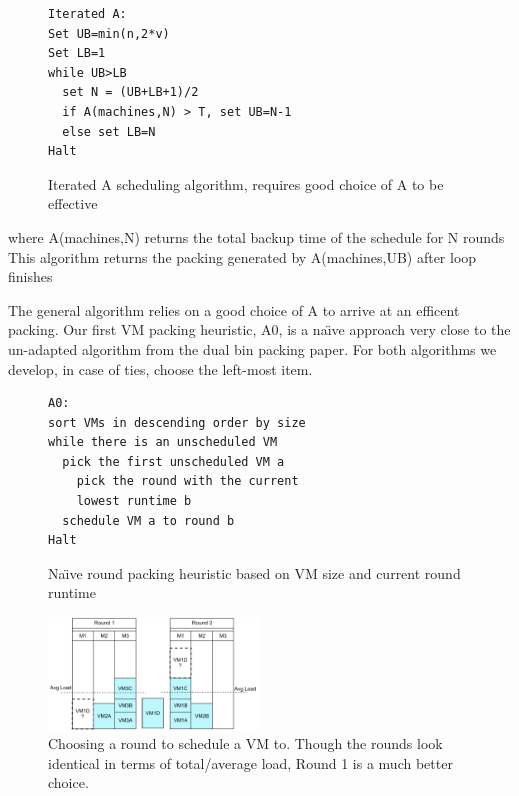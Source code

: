 \begin{figure}
\begin{lstlisting}[frame=single]
Iterated A:
Set UB=min(n,2*v)
Set LB=1
while UB>LB
  set N = (UB+LB+1)/2
  if A(machines,N) > T, set UB=N-1
  else set LB=N
Halt
\end{lstlisting}
\caption{Iterated A scheduling algorithm, requires good choice of A to be effective}
\end{figure}

where A(machines,N) returns the total backup time of the schedule for N rounds\\
This algorithm returns the packing generated by A(machines,UB) after loop finishes

The general algorithm relies on a good choice of A to arrive at an efficent
packing. Our first VM packing heuristic, A0, is a na\"\i{}ve approach very
close to the un-adapted algorithm from the dual bin packing paper. For both
algorithms we develop, in case of ties, choose the left-most item.

\begin{figure}
\begin{lstlisting}[frame=single]
A0:
sort VMs in descending order by size
while there is an unscheduled VM
  pick the first unscheduled VM a
    pick the round with the current
    lowest runtime b
  schedule VM a to round b
Halt
\end{lstlisting}
\caption{Na\"{\i}ve round packing heuristic based on VM size and current round runtime}
\end{figure}

\begin{figure}[thb]
\centering
\includegraphics[width=0.5\textwidth]{images/VMRound.pdf}
\caption{Choosing a round to schedule a VM to. Though the rounds look
identical in terms of total/average load, Round 1 is a much better choice.}
\label{fig:VMRound}
\end{figure}

